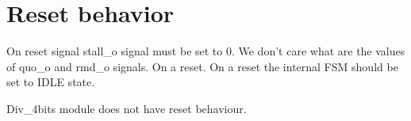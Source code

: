 \section{Reset behavior}

On reset signal stall\_o signal must be set to 0. We don't care what are the values of quo\_o and rmd\_o signals. On a reset. On a reset the internal FSM should be set to IDLE state.

Div\_4bits module does not have reset behaviour.


